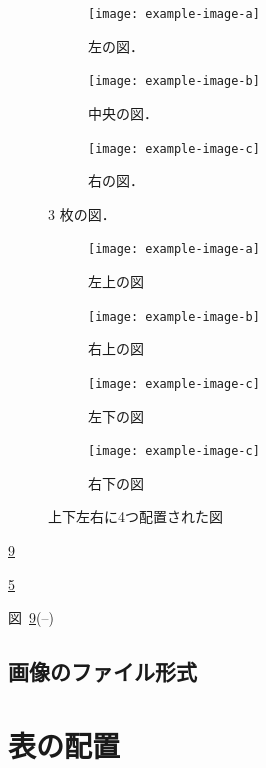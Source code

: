 \begin{figure}[tp]
    \centering
    \begin{subfigure}{0.32\textwidth}
        \centering
        \texttt{[image: example-image-a]}
        \caption{左の図．}
        \label{fig:example_a}
    \end{subfigure}
    \hfill %
    \begin{subfigure}{0.32\textwidth}
        \centering
        \texttt{[image: example-image-b]}
        \caption{中央の図．}
        \label{fig:example_b}
    \end{subfigure}
    \hfill %
    \begin{subfigure}{0.32\textwidth}
        \centering
        \texttt{[image: example-image-c]}
        \caption{右の図．}
        \label{fig:example_c}
    \end{subfigure}
    \caption{3 枚の図．}
    \label{fig:three_subfigures}
\end{figure}

\begin{figure}[tp]
    \centering
    \begin{subfigure}{0.45\textwidth}
        \centering
        \texttt{[image: example-image-a]}
        \caption{左上の図}
        \label{fig:sub1}
    \end{subfigure}
    \hfill %
    \begin{subfigure}{0.45\textwidth}
        \centering
        \texttt{[image: example-image-b]}
        \caption{右上の図}
        \label{fig:sub2}
    \end{subfigure}
    
    \vspace{5mm} %
    
    \begin{subfigure}[b]{0.45\textwidth}
        \centering
        \texttt{[image: example-image-c]}
        \caption{左下の図}
        \label{fig:sub3}
    \end{subfigure}
    \hfill %
    \begin{subfigure}[b]{0.45\textwidth}
        \centering
        \texttt{[image: example-image-c]}
        \caption{右下の図}
        \label{fig:sub4}
    \end{subfigure}
    \caption{上下左右に4つ配置された図}
    \label{fig:four_subfigures}
\end{figure}


\ref{fig:four_subfigures}

\ref{fig:sub1}

図~\ref{fig:four_subfigures}(--)




\subsection{画像のファイル形式}
\label{ssec:figure_format}



\section{表の配置}
\label{sec:table}






